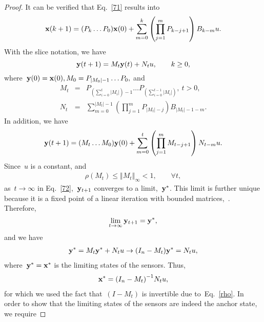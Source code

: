 \documentclass[draftclsnofoot, onecolumn, 12pt]{IEEEtran}
\begin{document}
\begin{proof}
It can be verified that Eq.~\eqref{71} results into
\begin{eqnarray*}
{\bf{x}}(k+1)= (P_k \ldots P_0){\bf{x}}(0) + \sum\limits_{m=0}^{k}\left(\prod_{j=1}^m P_{k-j+1}\right)B_{k-m}{{u}}.\\
\end{eqnarray*}
With the slice notation, we have
\begin{equation}\label{72}
{\bf{y}}(t+1)={{M}}_t{\bf{y}}(t)+{{N}}_t{{u}},\qquad k \geq 0,
\end{equation}
where~${\bf{y}}(0)={\bf{x}}(0),M_0 = P_{\vert M_0 \vert -1} \ldots P_0,$ and
\begin{eqnarray}
M_t &=& P_{\left(\sum\limits_{i=0}^{t}{\vert M_i \vert}\right) - 1} \ldots P_{\left(\sum\limits_{i=0}^{t-1}{\vert M_i \vert}\right)},~ t >0,\label{73}\\
N_t&=&\sum\limits_{m=0}^{{\vert M_t \vert - 1}}\left(\prod_{j=1}^m P_{{\vert M_t \vert}-j}\right)B_{{\vert M_t \vert - 1}-m}\label{74}.
\end{eqnarray}
In addition, we have
\begin{eqnarray*}
{\bf{y}}(t+1)=(M_t \ldots M_0){\bf{y}}(0) + \sum\limits_{m=0}^{t}\left(\prod_{j=1}^m M_{t-j+1}\right)N_{t-m}{{u}}.
\end{eqnarray*}
Since~$u$ is a constant, and
\begin{eqnarray}\label{rho}
\rho(M_t)\leq {\Vert M_t \Vert}_{\infty} < 1, \qquad \forall t,
\end{eqnarray}
as~$t \rightarrow \infty$ in Eq.~\eqref{72},~${\bf{y}}_{t+1}$ converges to a limit,~${\bf{y}}^{*}$. This limit is further unique because it is a fixed point of a linear iteration with bounded matrices,~\cite{tsit_book}. Therefore,
\begin{equation*}
\lim\limits_{t \rightarrow \infty} {\bf{y}}_{t+1}={\bf{y}}^{*},
\end{equation*}
and we have
\begin{eqnarray}
{\bf{y}}^{*} = M_t {\bf{y}}^{*} + N_t {{u}} \rightarrow (I_n-M_t){\bf{y}}^{*} = N_t {{u}},
\end{eqnarray}
where~${\bf{y}}^{*}={\bf{x}}^{*}$ is the limiting states of the sensors. Thus,
\begin{eqnarray}
{\bf{x}}^{*} = {(I_n-M_t)}^{-1} N_t {{u}},
\end{eqnarray}
for which we used the fact that~${(I-M_t)}$ is invertible due to~Eq.~\eqref{rho}. In order to show that the limiting states of the sensors are indeed the anchor state, we require

\end{proof}
\end{document}
